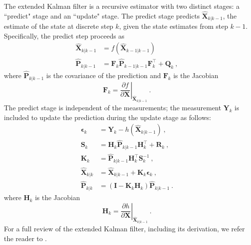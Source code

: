 \documentclass[fleqn,usenatbib,useAMS]{mnras}
\begin{document}
The extended Kalman filter is a recursive estimator with two distinct stages: a ``predict" stage and an ``update" stage. The predict stage predicts $\hat{\boldsymbol{X}}_{k|k-1}$, the estimate of the state at discrete step $k$, given the state estimates from step $k-1$. Specifically, the predict step proceeds as
\begin{align}
	\hat{\boldsymbol{X}}_{k|k-1} &=  f \left( \hat{\boldsymbol{X}}_{k-1|k-1}\right) \\
	\hat{\boldsymbol{P}}_{k|k-1} &=  \boldsymbol{F}_k \hat{\boldsymbol{P}}_{k-1|k-1} \boldsymbol{F}_k^\intercal + \boldsymbol{Q}_k  \ ,
\end{align}
where $\hat{\boldsymbol{P}}_{k|k-1}$ is the covariance of the prediction and $\boldsymbol{F}_k$ is the Jacobian
\begin{equation}
	\boldsymbol{F}_k = \left. \frac{\partial f}{\partial \boldsymbol{X} } \right \rvert_{	\hat{\boldsymbol{X}}_{k|k-1}} \ .
\end{equation}
The predict stage is independent of the measurements; the measurement $\boldsymbol{Y}_k$ is included to update the prediction during the update stage as follows:
\begin{align}
	\boldsymbol{\epsilon}_{k} &= \boldsymbol{Y}_k - h \left(\hat{\boldsymbol{X}}_{k|k-1} \right)\ , \label{eq:kalman_eq_1}\\
	\boldsymbol{S}_k &= \boldsymbol{H}_k \hat{\boldsymbol{P}}_{k|k-1} \boldsymbol{H}_k^\intercal + \boldsymbol{R}_k \ , \\
	\boldsymbol{K}_k &= \hat{\boldsymbol{P}}_{k|k-1} \boldsymbol{H}_k^\intercal \boldsymbol{S}_k^{-1} \ ,\label{eq:kalman gain} \\
	\hat{\boldsymbol{X}}_{k|k} &=\hat{\boldsymbol{X}}_{k|k-1} +\boldsymbol{K}_k  \boldsymbol{\epsilon}_{k}  \ , \label{eq:kalmangainupdate} \\
	\hat{\boldsymbol{P}}_{k|k} &= \left( \boldsymbol{I} - \boldsymbol{K}_k \boldsymbol{H}_k \right) 	\hat{\boldsymbol{P}}_{k|k-1} \label{eq:kalman_eq_last}\ .
\end{align}
where $\boldsymbol{H}_k$ is the Jacobian
\begin{equation}
	\boldsymbol{H}_k = \left. \frac{\partial h}{\partial \boldsymbol{X} } \right \rvert_{	\hat{\boldsymbol{X}}_{k|k-1}} \ .
\end{equation}
For a full review of the extended Kalman filter, including its derivation, we refer the reader to \cite{zarchan2000fundamentals}. \newline 
\end{document}
